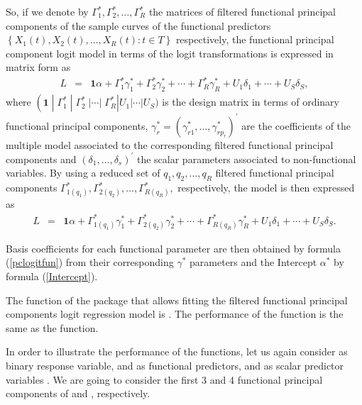 So, if we denote by $\Gamma_1^{\ast},\Gamma_2^{\ast},\ldots,\Gamma_R^{\ast}$ the matrices of filtered functional principal components of the sample curves of the functional predictors $\left\{ X_1\left( t\right),X_2\left( t\right),\ldots,X_R\left( t\right) :t\in T\right\} $ respectively, the functional principal component logit model in terms of the logit transformations is expressed in matrix form as
\begin{eqnarray*}
L&=& \mathbf{1}\alpha + \Gamma_1^{\ast} \gamma_1^{\ast} + \Gamma_2^{\ast} \gamma_2^{\ast} + \cdots + \Gamma_R^{\ast} \gamma_R^{\ast}+U_1 \delta_1+\cdots+U_S \delta_S,
\end{eqnarray*}
where $\left( \mathbf{1}\;|\;\Gamma_1^{\ast}\;|\;\Gamma_2^{\ast}\;| \cdots |\;\Gamma_R^{\ast} \right|U_1 | \cdots |U_S ) $ is the design matrix in terms of ordinary functional principal components, $\gamma_r^{\ast} =\left( \gamma_{r1}^{\ast},\ldots ,\gamma_{rp_r}^{\ast}\right)^{\prime }$ are the coefficients of the multiple model associated to the corresponding filtered functional principal components and $\left( \delta_{1},\ldots ,\delta_{s}\right)^{\prime }$ the scalar parameters associated to non-functional variables. By using a reduced set of $q_1,q_2,\ldots,q_R$ filtered functional principal components $\Gamma_{1(q_1)}^{\ast},\Gamma_{2(q_2)}^{\ast},\ldots,\Gamma_{R(q_R)}^{\ast},$ respectively, the model is then expressed as
\begin{eqnarray*}
L&=& \mathbf{1}\alpha + \Gamma_{1(q_1)}^{\ast} \gamma_1^{\ast} + \Gamma_{2(q_2)}^{\ast} \gamma_2^{\ast} + \cdots + \Gamma_{R(q_R)}^{\ast} \gamma_R^{\ast} +U_1 \delta_1+\cdots+U_S \delta_S.
\end{eqnarray*}

Basis coefficients for each functional parameter are then obtained by formula (\ref{pclogitfun}) from their corresponding $\gamma^{\ast}$ parameters and the Intercept $\alpha^{\ast}$ by formula (\ref{Intercept}).

The function of the  package that allows fitting the filtered functional principal components logit regression model is . The performance of the function is the same as the  function.

In order to illustrate the performance of the functions, let us again consider  as binary response variable,  and  as functional predictors, and as scalar predictor variables . We are going to consider the first 3 and 4 functional principal components of  and , respectively.

